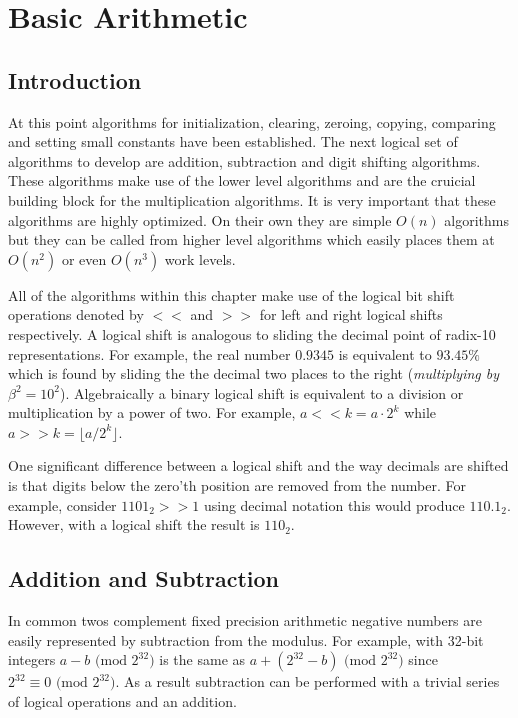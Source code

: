 \documentclass[b5paper]{book}
\begin{document}
\chapter{Basic Arithmetic}
\section{Introduction}
At this point algorithms for initialization, clearing, zeroing, copying, comparing and setting small constants have been 
established.  The next logical set of algorithms to develop are addition, subtraction and digit shifting algorithms.  These 
algorithms make use of the lower level algorithms and are the cruicial building block for the multiplication algorithms.  It is very important 
that these algorithms are highly optimized.  On their own they are simple $O(n)$ algorithms but they can be called from higher level algorithms 
which easily places them at $O(n^2)$ or even $O(n^3)$ work levels.  

All of the algorithms within this chapter make use of the logical bit shift operations denoted by $<<$ and $>>$ for left and right 
logical shifts respectively.  A logical shift is analogous to sliding the decimal point of radix-10 representations.  For example, the real 
number $0.9345$ is equivalent to $93.45\%$ which is found by sliding the the decimal two places to the right (\textit{multiplying by $\beta^2 = 10^2$}).  
Algebraically a binary logical shift is equivalent to a division or multiplication by a power of two.  
For example, $a << k = a \cdot 2^k$ while $a >> k = \lfloor a/2^k \rfloor$.

One significant difference between a logical shift and the way decimals are shifted is that digits below the zero'th position are removed
from the number.  For example, consider $1101_2 >> 1$ using decimal notation this would produce $110.1_2$.  However, with a logical shift the 
result is $110_2$.  

\section{Addition and Subtraction}
In common twos complement fixed precision arithmetic negative numbers are easily represented by subtraction from the modulus.  For example, with 32-bit integers
$a - b\mbox{ (mod }2^{32}\mbox{)}$ is the same as $a + (2^{32} - b) \mbox{ (mod }2^{32}\mbox{)}$  since $2^{32} \equiv 0 \mbox{ (mod }2^{32}\mbox{)}$.  
As a result subtraction can be performed with a trivial series of logical operations and an addition.
\end{document}
